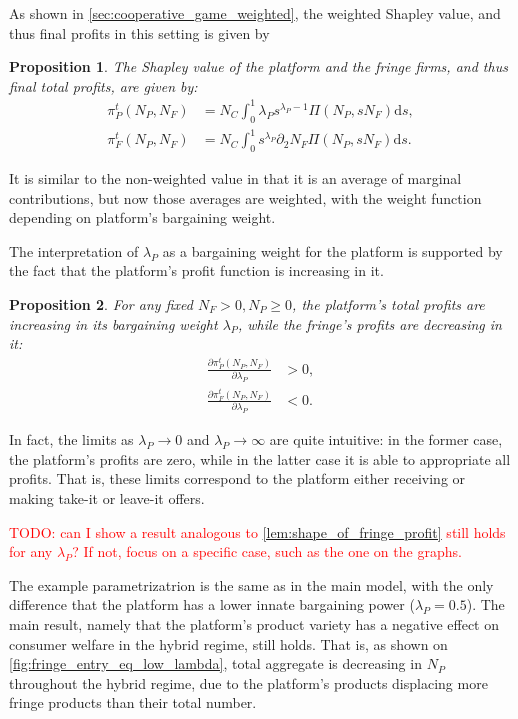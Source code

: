 \documentclass[a4paper]{article}
\newtheorem{proposition}{Proposition}
\newcommand{\ds}{\mathrm{d}s}
\begin{document}
As shown in \cref{sec:cooperative_game_weighted}, the weighted Shapley value, and thus final profits in this setting is given by
\begin{proposition}
    \label{prop:weighted_shapley_value}
    The Shapley value of the platform and the fringe firms, and thus final total profits, are given by:
    \begin{align*}
        \pi^t_P(N_P, N_F) &= N_C \int_0^1 \lambda_P s ^ {\lambda_P - 1} \Pi(N_P,s N_F) \ds, \\
        \pi^t_F(N_P, N_F) &= N_C \int_0^1 s ^ {\lambda_P} \partial_2 N_F \Pi(N_P,s N_F) \ds.
    \end{align*}
\end{proposition}
It is similar to the non-weighted value in that it is an average of marginal contributions, but now those averages are weighted, with the weight function depending on platform's bargaining weight.

The interpretation of $\lambda_P$ as a bargaining weight for the platform is supported by the fact that the platform's profit function is increasing in it.
\begin{proposition}
    \label{prop:lambda_P_comparative}
    For any fixed $N_F >0, N_P \geq 0$, the platform's total profits are increasing in its bargaining weight $\lambda_P$, while the fringe's profits are decreasing in it:
    \begin{align*}
        \frac{\partial \pi_P^t(N_P, N_F)}{\partial \lambda_P} &> 0, \\
        \frac{\partial \pi_F^t(N_P, N_F)}{\partial \lambda_P} &< 0.
    \end{align*}
\end{proposition}
In fact, the limits as $\lambda_P \to 0$ and $\lambda_P \to \infty$ are quite intuitive: in the former case, the platform's profits are zero, while in the latter case it is able to appropriate all profits.
That is, these limits correspond to the platform either receiving or making take-it or leave-it offers.

\textcolor{red}{TODO: can I show a result analogous to \cref{lem:shape_of_fringe_profit} still holds for any $\lambda_P$? If not, focus on a specific case, such as the one on the graphs.}

The example parametrizatrion is the same as in the main model, with the only difference that the platform has a lower innate bargaining power ($\lambda_P = 0.5$).
The main result, namely that the platform's product variety has a negative effect on consumer welfare in the hybrid regime, still holds.
That is, as shown on \cref{fig:fringe_entry_eq_low_lambda}, total aggregate is decreasing in $N_P$ throughout the hybrid regime, due to the platform's products displacing more fringe products than their total number.
\end{document}
